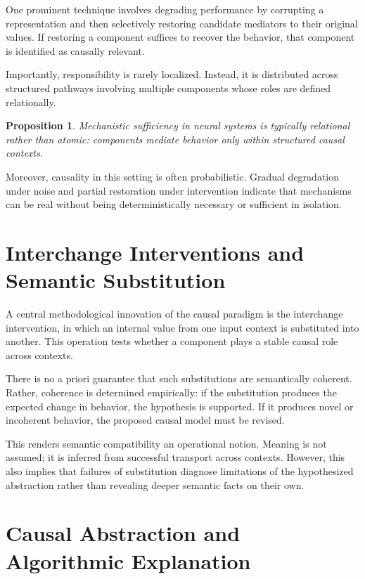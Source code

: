 \documentclass[11pt]{article}
\newtheorem{proposition}{Proposition}
\begin{document}
One prominent technique involves degrading performance by corrupting a representation and then selectively restoring candidate mediators to their original values. If restoring a component suffices to recover the behavior, that component is identified as causally relevant.

Importantly, responsibility is rarely localized. Instead, it is distributed across structured pathways involving multiple components whose roles are defined relationally.

\begin{proposition}
Mechanistic sufficiency in neural systems is typically relational rather than atomic: components mediate behavior only within structured causal contexts.
\end{proposition}

Moreover, causality in this setting is often probabilistic. Gradual degradation under noise and partial restoration under intervention indicate that mechanisms can be real without being deterministically necessary or sufficient in isolation.

\section{Interchange Interventions and Semantic Substitution}

A central methodological innovation of the causal paradigm is the interchange intervention, in which an internal value from one input context is substituted into another. This operation tests whether a component plays a stable causal role across contexts.

There is no a priori guarantee that such substitutions are semantically coherent. Rather, coherence is determined empirically: if the substitution produces the expected change in behavior, the hypothesis is supported. If it produces novel or incoherent behavior, the proposed causal model must be revised.

This renders semantic compatibility an operational notion. Meaning is not assumed; it is inferred from successful transport across contexts. However, this also implies that failures of substitution diagnose limitations of the hypothesized abstraction rather than revealing deeper semantic facts on their own.

\section{Causal Abstraction and Algorithmic Explanation}
\end{document}
